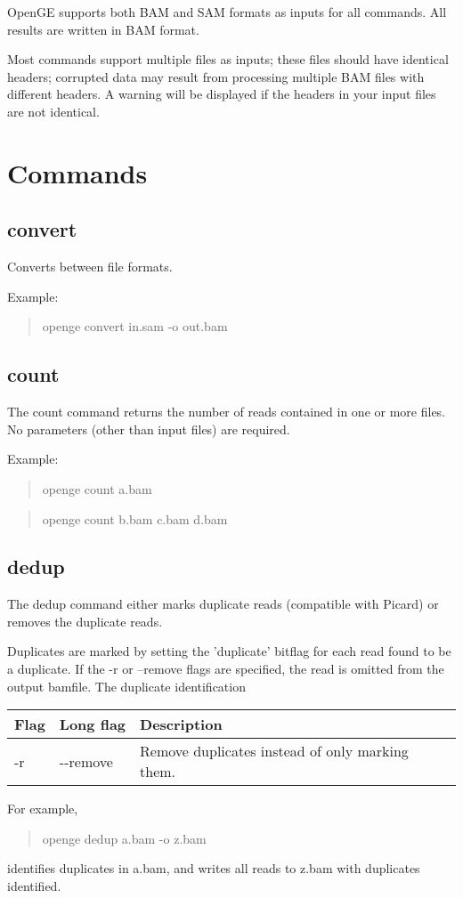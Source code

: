 \documentclass[11pt]{article}
\newcommand {\cmd}[1] {\begin{quote}#1\end{quote}}
\begin{document}
OpenGE supports both BAM and SAM formats as inputs for all commands. All results are written in BAM format.

Most commands support multiple files as inputs; these files should have identical headers; corrupted data may result from processing multiple BAM files with different headers. A warning will be displayed if the headers in your input files are not identical.

\section {Commands}

\subsection {convert}
Converts between file formats.

Example:
\cmd{openge convert in.sam -o out.bam}
\subsection {count}
The count command returns the number of reads contained in one or more files. No parameters (other than input files) are required.

Example:
\cmd{openge count a.bam}
\cmd{openge count b.bam c.bam d.bam}

\subsection {dedup}
The dedup command either marks duplicate reads (compatible with Picard) or removes the duplicate reads. 

Duplicates are marked by setting the 'duplicate' bitflag for each read found to be a duplicate. If the -r or --remove flags are specified, the read is omitted from the output bamfile. The duplicate identification 

\begin{center}
\begin{tabular}{llp{3.5in}}
\hline
Flag&Long flag&Description\\ \hline
-r&{-}{-}remove&Remove duplicates instead of only marking them.\\
\end{tabular}
\end{center}

For example,
\cmd{openge dedup a.bam -o z.bam} 
identifies duplicates in a.bam, and writes all reads to z.bam with duplicates identified.
\end{document}
